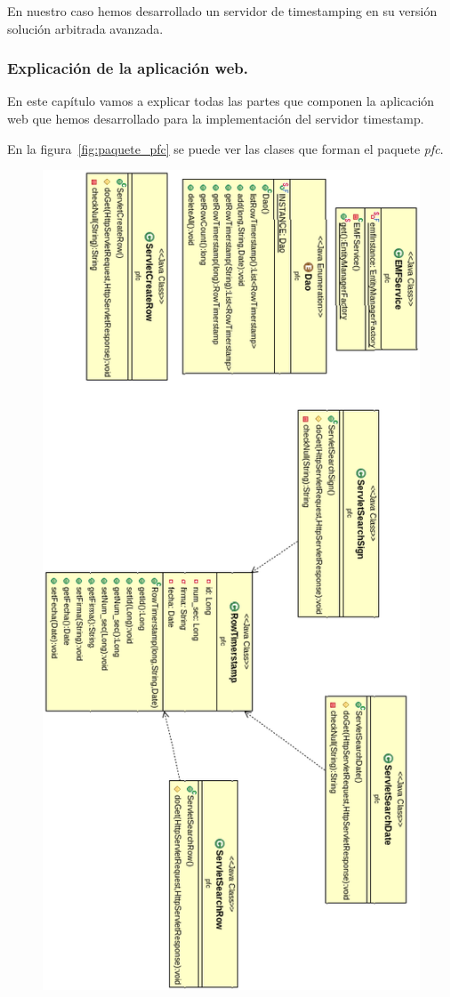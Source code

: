 En nuestro caso hemos desarrollado un servidor de timestamping en su versión solución arbitrada avanzada.


\subsubsection{Explicación de la aplicación web.}
En este capítulo vamos a explicar todas las partes que componen la aplicación web que hemos desarrollado para la implementación del servidor timestamp.

En la figura~\ref{fig:paquete_pfc} se puede ver las clases que forman el paquete \textit{pfc}.

\begin{figure}
  \centering
    \includegraphics[scale=0.6]{./GoogleAppEngine/imagenes/UML_pfc.png}

\end{figure}
